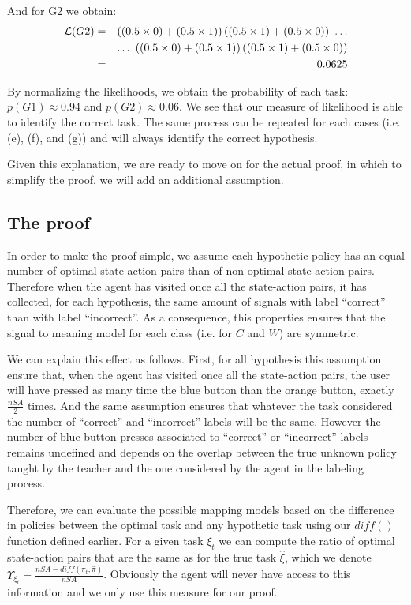 And for G2 we obtain:
%
\begin{eqnarray}
\mathcal{L}(G2) &=& \left((0.5\times0)+(0.5\times1)\right)\left((0.5\times1)+(0.5\times0)\right)~\ldots  \nonumber \\
&& \ldots~\left((0.5\times0)+(0.5\times1)\right)\left((0.5\times1)+(0.5\times0)\right) \nonumber \\
&=& 0.0625 \nonumber
\end{eqnarray}

By normalizing the likelihoods, we obtain the probability of each task: $p(G1) \approx 0.94$ and $p(G2) \approx 0.06$. We see that our measure of likelihood is able to identify the correct task. The same process can be repeated for each cases (i.e. (e), (f), and (g)) and will always identify the correct hypothesis. 

Given this explanation, we are ready to move on for the actual proof, in which to simplify the proof, we will add an additional assumption.

\subsection{The proof}

In order to make the proof simple, we assume each hypothetic policy has an equal number of optimal state-action pairs than of non-optimal state-action pairs. Therefore when the agent has visited once all the state-action pairs, it has collected, for each hypothesis, the same amount of signals with label ``correct'' than with label ``incorrect''. As a consequence, this properties ensures that the signal to meaning model for each class (i.e. for $C$ and $W$) are symmetric. 

We can explain this effect as follows. First, for all hypothesis this assumption ensure that, when the agent has visited once all the state-action pairs, the user will have pressed as many time the blue button than the orange button, exactly $\frac{nSA}{2}$ times. And the same assumption ensures that whatever the task considered the number of ``correct'' and ``incorrect'' labels will be the same. However the number of blue button presses associated to ``correct'' or ``incorrect'' labels remains undefined and depends on the overlap between the true unknown policy taught by the teacher and the one considered by the agent in the labeling process. 

Therefore, we can evaluate the possible mapping models based on the difference in policies between the optimal task and any hypothetic task using our $diff()$ function defined earlier. For a given task $\xi_t$ we can compute the ratio of optimal state-action pairs that are the same as for the true task $\hat{\xi}$, which we denote $\Upsilon_{\xi_t} = \frac{nSA - diff(\pi_t, \hat{\pi})}{nSA}$. Obviously the agent will never have access to this information and we only use this measure for our proof.

